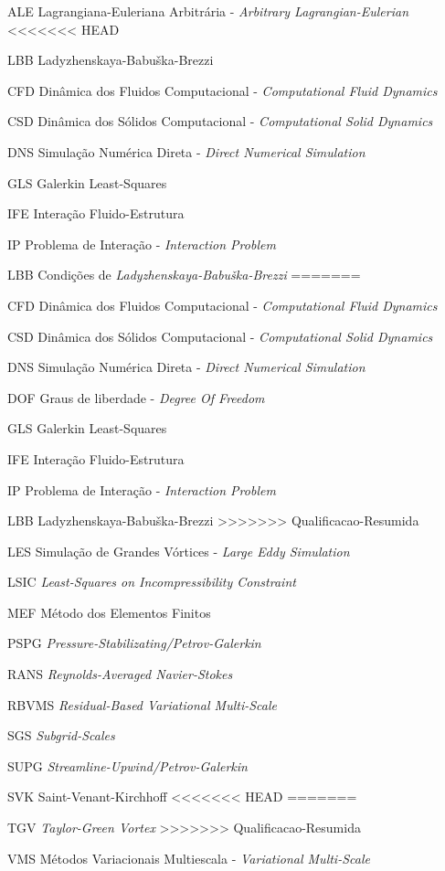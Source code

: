 \begin{siglas}
    \item[ALE] Lagrangiana-Euleriana Arbitrária - \textit{Arbitrary Lagrangian-Eulerian}
<<<<<<< HEAD
    \item[LBB] Ladyzhenskaya-Babuška-Brezzi
    \item[CFD] Dinâmica dos Fluidos Computacional - \textit{Computational Fluid Dynamics}
    \item[CSD] Dinâmica dos Sólidos Computacional - \textit{Computational Solid Dynamics}
    \item[DNS] Simulação Numérica Direta - \textit{Direct Numerical Simulation}
    \item[GLS] Galerkin Least-Squares
    \item[IFE] Interação Fluido-Estrutura
    \item[IP] Problema de Interação - \textit{Interaction Problem}
    \item[LBB] Condições de \textit{Ladyzhenskaya-Babuška-Brezzi}
=======
    \item[CFD] Dinâmica dos Fluidos Computacional - \textit{Computational Fluid Dynamics}
    \item[CSD] Dinâmica dos Sólidos Computacional - \textit{Computational Solid Dynamics}
    \item[DNS] Simulação Numérica Direta - \textit{Direct Numerical Simulation}
    \item[DOF] Graus de liberdade - \textit{Degree Of Freedom}
    \item[GLS] Galerkin Least-Squares
    \item[IFE] Interação Fluido-Estrutura
    \item[IP] Problema de Interação - \textit{Interaction Problem}
    \item[LBB] Ladyzhenskaya-Babuška-Brezzi
>>>>>>> Qualificacao-Resumida
    \item[LES] Simulação de Grandes Vórtices - \textit{Large Eddy Simulation}
    \item[LSIC] \textit{Least-Squares on Incompressibility Constraint}
    \item[MEF] Método dos Elementos Finitos
    \item[PSPG] \textit{Pressure-Stabilizating/Petrov-Galerkin}
    \item[RANS] \textit{Reynolds-Averaged Navier-Stokes}
    \item[RBVMS] \textit{Residual-Based Variational Multi-Scale}
    \item[SGS] \textit{Subgrid-Scales}
    \item[SUPG] \textit{Streamline-Upwind/Petrov-Galerkin}
    \item[SVK] Saint-Venant-Kirchhoff
<<<<<<< HEAD
=======
    \item[TGV] \textit{Taylor-Green Vortex}
>>>>>>> Qualificacao-Resumida
    \item[VMS] Métodos Variacionais Multiescala - \textit{Variational Multi-Scale}
\end{siglas}